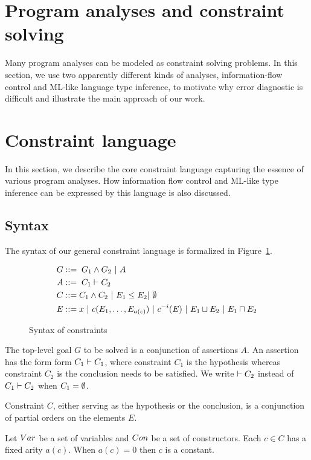 \section{Program analyses and constraint solving}

Many program analyses can be modeled as constraint solving problems. In this
section, we use two apparently different kinds of analyses, information-flow
control and ML-like language type inference, to motivate why error diagnostic
is difficult and illustrate the main approach of our work.


\section{Constraint language}
\label{sec:language}

In this section, we describe the core constraint language capturing the essence
of various program analyses. How information flow control and ML-like type
inference can be expressed by this language is also discussed. 

\subsection{Syntax}

The syntax of our general constraint language is formalized in
Figure~\ref{figure:lang:syntax}.

\begin{figure}
\begin{align*}
G &::=\; G_1 \land G_2\ |\ A \\
A &::=\; C_1 \vdash C_2 \\
C &::= C_1 \land C_2\ |\  E_1 \leq E_2 |\ \emptyset \\
E &::= x\ |\ c(E_1,\dots,E_{a(c)})\ |\ c^{-i}(E)\ |\ E_1 \sqcup E_2 \
|\ E_1 \sqcap E_2
\end{align*}
\caption{Syntax of constraints}
\label{figure:lang:syntax}
\end{figure}

The top-level goal $G$ to be solved is a conjunction of assertions $A$. An
assertion has the form form $C_1 \vdash C_1$, where constraint $C_1$ is the
hypothesis whereas constraint $C_2$ is the conclusion needs to be satisfied. We
write $ \vdash C_2$ instead of $ C_1 \vdash C_2$ when $C_1=\emptyset$.

Constraint $C$, either serving as the hypothesis or the conclusion, is a
conjunction of partial orders on the elements $E$.

Let $Var$ be a set of variables and $Con$ be a set of constructors.
Each $c\in C$ has a fixed arity $a(c)$. When $a(c)=0$ then $c$ is a constant.

